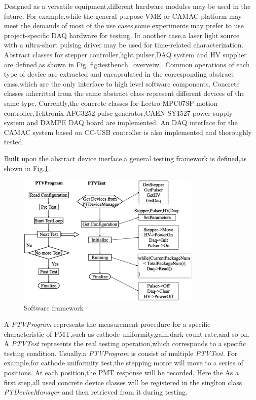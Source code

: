\documentclass[preprint,5p,times]{elsarticle}
\begin{document}
Designed as a versatile equipment,different hardware modules may be used in the future.
For example,while the general-purpose VME or CAMAC platform may meet the demands of most of the use cases,some experiments may prefer to use project-specific DAQ hardware for testing.
In another case,a laser light source with a ultra-short pulsing driver may be used for time-related characterization.
Abstract classes for stepper controller,light pulser,DAQ system and HV supplier are defined,as shown in Fig.\ref{fig:testbench_overveiw}.
Common operations of each type of device are extracted and encapsulated in the corresponding abstract class,which are the only interface to high level software components.
Concrete classes inheritted from the same abstract class represent different devices of the same type.
Currently,the concrete classes for Leetro MPC07SP motion controller,Tektronix AFG3252 pulse generator,CAEN SY1527 power supply system and DAMPE DAQ board are implemented.
An DAQ interface for the CAMAC system based on CC-USB controller is also implemented and thoroughly tested.

Built upon the abstract device inerface,a general testing framework is defined,as shown in Fig.\ref{fig:software_framework}.
\begin{figure}[h!]
\centering
 \includegraphics[width=90mm]{software_framework}
\caption{Software framework}
\label{fig:software_framework}
\end{figure}
A \textit{PTVProgram} represents the measurement procedure for a specific characteristic of PMT,such as cathode uniformity,gain,dark count rate,and so on.
A \textit{PTVTest} represents the real testing operation,which corresponds to a specific testing condition.
Usually,a \textit{PTVProgram} is consist of multiple \textit{PTVTest}.
For example,for cathode uniformity test,the stepping motor will move to a series of positions.
At each position,the PMT response will be recorded.
Here the 
As a first step,all used concrete device classes will be registered in the singlton class \textit{PTDeviceManager} and then retrieved from it during testing. 
\end{document}
